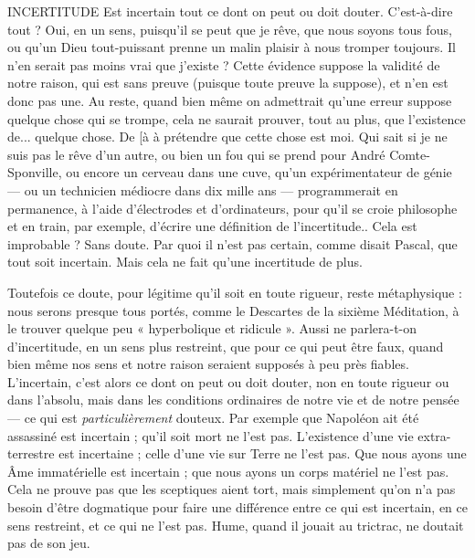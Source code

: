 INCERTITUDE Est incertain tout ce dont on peut ou doit douter. C’est-à-dire
tout ? Oui, en un sens, puisqu'il se peut que je rêve,
que nous soyons tous fous, ou qu’un Dieu tout-puissant prenne un malin
plaisir à nous tromper toujours. Il n’en serait pas moins vrai que j’existe ?
Cette évidence suppose la validité de notre raison, qui est sans preuve (puisque
toute preuve la suppose), et n’en est donc pas une. Au reste, quand bien même
on admettrait qu’une erreur suppose quelque chose qui se trompe, cela ne saurait
prouver, tout au plus, que l’existence de... quelque chose. De [à à prétendre
que cette chose est moi. Qui sait si je ne suis pas le rêve d’un autre, ou
bien un fou qui se prend pour André Comte-Sponville, ou encore un cerveau
dans une cuve, qu’un expérimentateur de génie — ou un technicien médiocre
dans dix mille ans — programmerait en permanence, à l’aide d’électrodes et
d’ordinateurs, pour qu’il se croie philosophe et en train, par exemple, d’écrire
une définition de l’incertitude.. Cela est improbable ? Sans doute. Par quoi il
n’est pas certain, comme disait Pascal, que tout soit incertain. Mais cela ne fait
qu’une incertitude de plus.

Toutefois ce doute, pour légitime qu’il soit en toute rigueur, reste
métaphysique : nous serons presque tous portés, comme le Descartes de la
sixième Méditation, à le trouver quelque peu « hyperbolique et ridicule ». Aussi
ne parlera-t-on d’incertitude, en un sens plus restreint, que pour ce qui peut
être faux, quand bien même nos sens et notre raison seraient supposés à peu
près fiables. L’incertain, c’est alors ce dont on peut ou doit douter, non en
toute rigueur ou dans l’absolu, mais dans les conditions ordinaires de notre vie
et de notre pensée — ce qui est {\it particulièrement} douteux. Par exemple que
Napoléon ait été assassiné est incertain ; qu’il soit mort ne l’est pas. L'existence
d’une vie extra-terrestre est incertaine ; celle d’une vie sur Terre ne l’est pas.
Que nous ayons une Âme immatérielle est incertain ; que nous ayons un corps
matériel ne l’est pas. Cela ne prouve pas que les sceptiques aient tort, mais simplement
qu’on n’a pas besoin d’être dogmatique pour faire une différence entre
ce qui est incertain, en ce sens restreint, et ce qui ne l’est pas. Hume, quand il
jouait au trictrac, ne doutait pas de son jeu.

